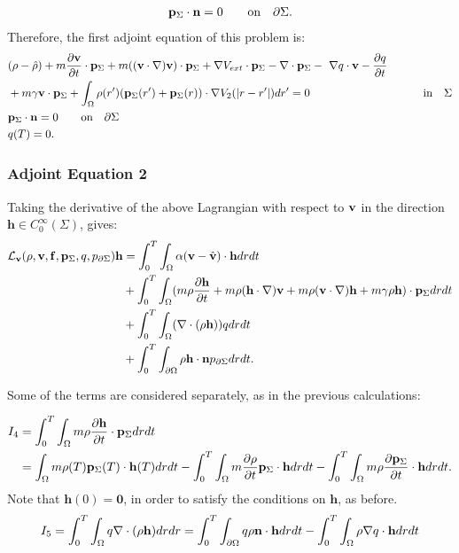 \begin{align*}
\mathbf{p}_\Sigma \cdot \mathbf{n} = 0 \qquad \text{on} \quad \partial \Sigma.
\end{align*}
Therefore, the first adjoint equation of this problem is:
\begin{align*}
&(\rho - \hat {\rho}) +m  \frac{\partial \mathbf{v}}{\partial t}\cdot \mathbf{p}_\Sigma + m ( (\mathbf{v} \cdot \nabla)\mathbf{v}) \cdot \mathbf{p}_\Sigma+ \nabla V_{ext}\cdot \mathbf{p}_\Sigma -\nabla\cdot \mathbf{p}_\Sigma  - \ \nabla q \cdot \mathbf{v}  -  \frac{\partial q}{\partial t}\\
&+ m \gamma \mathbf{v} \cdot \mathbf{p}_\Sigma + \int_\Omega  \rho(r')(\mathbf{p}_\Sigma(r') + \mathbf{p}_\Sigma(r)) \cdot\nabla V_2(|r-r'|)   dr'  =0 \qquad\qquad\qquad\qquad\qquad \text{in} \quad \Sigma \\
& \mathbf{p}_\Sigma \cdot \mathbf{n} = 0 \qquad \text{on} \quad \partial \Sigma\\
 &q(T) = {0} .
\end{align*}

\subsubsection*{Adjoint Equation 2}
Taking the derivative of the above Lagrangian with respect to $\mathbf{v}$ in the direction $\mathbf{h} \in C_0^\infty(\Sigma)$, gives:
\begin{align*}
\mathcal{L}_{\mathbf{v}}(\rho,\mathbf{v},\mathbf{f},\mathbf{p}_\Sigma,q,p_{\partial \Sigma})\mathbf{h} &= \int_0^T \int_\Omega 
 \alpha(\mathbf{v} - \hat {\mathbf{v}})\cdot \mathbf{h} drdt  \\
&+ \int_0^T \int_\Omega (m \rho \frac{\partial \mathbf{h} }{\partial t} + m \rho (\mathbf{h} \cdot \nabla)\mathbf{v} + m \rho (\mathbf{v} \cdot \nabla)\mathbf{h} + m \gamma \rho \mathbf{h}) \cdot \mathbf{p}_\Sigma dr dt\\
& + \int_0^T \int_\Omega ( \nabla \cdot (\rho \mathbf{h})) q dr dt\\ 
& +\int_0^T \int_{\partial\Omega} \rho \mathbf{h} \cdot \mathbf{n} p_{\partial \Sigma} dr dt.
\end{align*}

Some of the terms are considered separately, as in the previous calculations:

\begin{align*}
I_4 &= \int_0^T \int_\Omega m \rho \frac{\partial \mathbf{h} }{\partial t} \cdot \mathbf{p}_\Sigma dr dt \\
&= \int_\Omega m \rho(T) \mathbf{p}_\Sigma(T) \cdot \mathbf{h}(T) dr dt - \int_0^T \int_\Omega  m\frac{\partial \rho}{\partial t} \mathbf{p}_\Sigma \cdot \mathbf{h} dr dt - \int_0^T \int_\Omega m \rho \frac{\partial \mathbf{p}_\Sigma}{\partial t} \cdot \mathbf{h} dr dt.
\end{align*}
Note that $\mathbf{h}(0)=\mathbf{0}$, in order to satisfy the conditions on $\mathbf{h}$, as before.
\begin{align*}
I_5= \int_0^T \int_\Omega q\nabla \cdot ( \rho \mathbf{h}) dr dr = \int_0^T \int_{\partial \Omega} q \rho  \mathbf{n}\cdot \mathbf{h} dr dt - \int_0^T \int_\Omega \rho\nabla q \cdot  \mathbf{h} dr dt
\end{align*}

